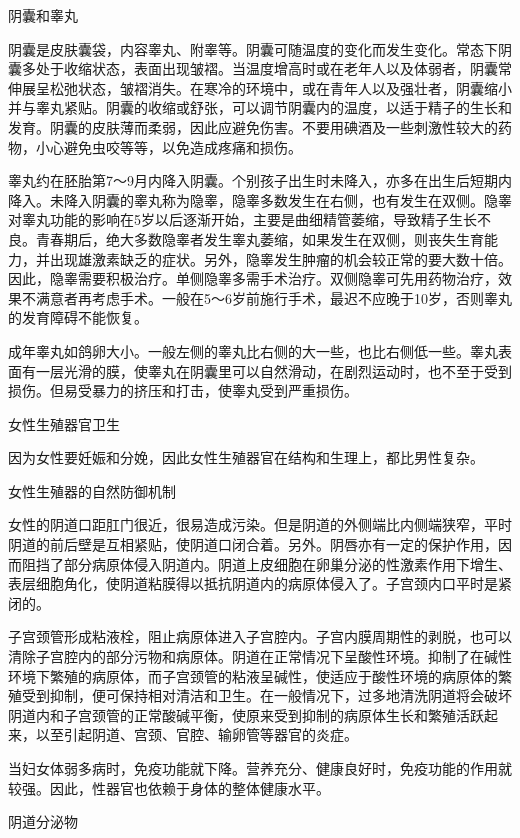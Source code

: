 \documentclass[12pt,UTF8]{ctexbook}
\begin{document}
阴囊和睾丸

阴囊是皮肤囊袋，内容睾丸、附睾等。阴囊可随温度的变化而发生变化。常态下阴囊多处于收缩状态，表面出现皱褶。当温度增高时或在老年人以及体弱者，阴囊常伸展呈松弛状态，皱褶消失。在寒冷的环境中，或在青年人以及强壮者，阴囊缩小并与睾丸紧贴。阴囊的收缩或舒张，可以调节阴囊内的温度，以适于精子的生长和发育。阴囊的皮肤薄而柔弱，因此应避免伤害。不要用碘酒及一些刺激性较大的药物，小心避免虫咬等等，以免造成疼痛和损伤。

睾丸约在胚胎第7～9月内降入阴囊。个别孩子出生时未降入，亦多在出生后短期内降入。未降入阴囊的睾丸称为隐睾，隐睾多数发生在右侧，也有发生在双侧。隐睾对睾丸功能的影响在5岁以后逐渐开始，主要是曲细精管萎缩，导致精子生长不良。青春期后，绝大多数隐睾者发生睾丸萎缩，如果发生在双侧，则丧失生育能力，并出现雄激素缺乏的症状。另外，隐睾发生肿瘤的机会较正常的要大数十倍。因此，隐睾需要积极治疗。单侧隐睾多需手术治疗。双侧隐睾可先用药物治疗，效果不满意者再考虑手术。一般在5～6岁前施行手术，最迟不应晚于10岁，否则睾丸的发育障碍不能恢复。

成年睾丸如鸽卵大小。一般左侧的睾丸比右侧的大一些，也比右侧低一些。睾丸表面有一层光滑的膜，使睾丸在阴囊里可以自然滑动，在剧烈运动时，也不至于受到损伤。但易受暴力的挤压和打击，使睾丸受到严重损伤。





女性生殖器官卫生


因为女性要妊娠和分娩，因此女性生殖器官在结构和生理上，都比男性复杂。

女性生殖器的自然防御机制

女性的阴道口距肛门很近，很易造成污染。但是阴道的外侧端比内侧端狭窄，平时阴道的前后壁是互相紧贴，使阴道口闭合着。另外。阴唇亦有一定的保护作用，因而阻挡了部分病原体侵入阴道内。阴道上皮细胞在卵巢分泌的性激素作用下增生、表层细胞角化，使阴道粘膜得以抵抗阴道内的病原体侵入了。子宫颈内口平时是紧闭的。

子宫颈管形成粘液栓，阻止病原体进入子宫腔内。子宫内膜周期性的剥脱，也可以清除子宫腔内的部分污物和病原体。阴道在正常情况下呈酸性环境。抑制了在碱性环境下繁殖的病原体，而子宫颈管的粘液呈碱性，使适应于酸性环境的病原体的繁殖受到抑制，便可保持相对清洁和卫生。在一般情况下，过多地清洗阴道将会破坏阴道内和子宫颈管的正常酸碱平衡，使原来受到抑制的病原体生长和繁殖活跃起来，以至引起阴道、宫颈、官腔、输卵管等器官的炎症。

当妇女体弱多病时，免疫功能就下降。营养充分、健康良好时，免疫功能的作用就较强。因此，性器官也依赖于身体的整体健康水平。

阴道分泌物
\end{document}
